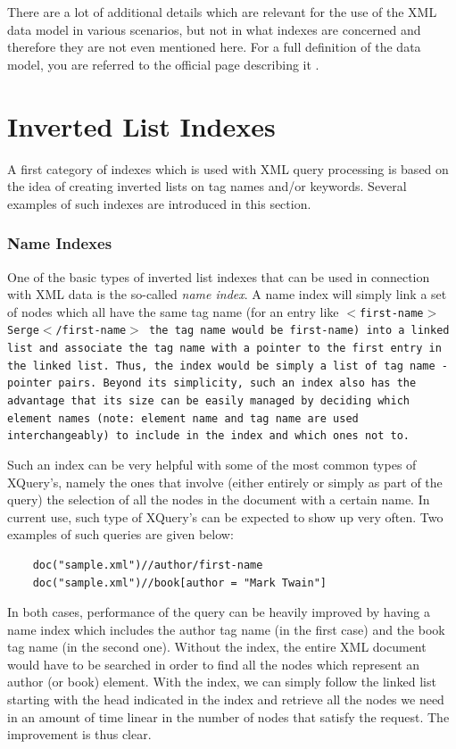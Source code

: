 \documentclass[a4paper,10pt]{article}
\begin{document}
There are a lot of additional details which are relevant for the use of the XML data model
in various scenarios, but not in what indexes are concerned and therefore they are not
even mentioned here. For a full definition of the data model, you are referred to the official
page describing it \cite{w3cdm}.

\section{Inverted List Indexes}
\label{sec:ili}

A first category of indexes which is used with XML query processing is based on
the idea of creating inverted lists on tag names and/or keywords. Several examples
of such indexes are introduced in this section.

\subsubsection*{Name Indexes}

One of the basic types of inverted list indexes that can be used in connection with XML data
is the so-called \textit{name index}. A name index will simply link a set of nodes
which all have the same tag name (for an entry like \tt{}$<$first-name$>$Serge$<$/first-name$>$
\normalfont{}the tag name would be \tt{}first-name\normalfont{}) into a linked list
and associate the tag name with a pointer to the first entry in the linked list. Thus,
the index would be simply a list of tag name - pointer pairs. Beyond its simplicity,
such an index also has the advantage that its size can be easily managed by
deciding which element names (note: element name and tag name are used
interchangeably) to include in the index and which ones not to.

Such an index can be very helpful with some of the most common types of
XQuery's, namely the ones that involve (either entirely or simply as part of the
query) the selection of all the nodes in the document with a certain name. In
current use, such type of XQuery's can be expected to show up very often. Two
examples of such queries are given below:

\begin{verbatim}
    doc("sample.xml")//author/first-name
    doc("sample.xml")//book[author = "Mark Twain"]
\end{verbatim}

In both cases, performance of the query can be heavily improved by having a
name index which includes the author tag name (in the first case) and the book
tag name (in the second one). Without the index, the entire XML document
would have to be searched in order to find all the nodes which represent an
author (or book) element. With the index, we can simply follow the linked list
starting with the head indicated in the index and retrieve all the nodes we need
in an amount of time linear in the number of nodes that satisfy the request. The
improvement is thus clear.
\end{document}
